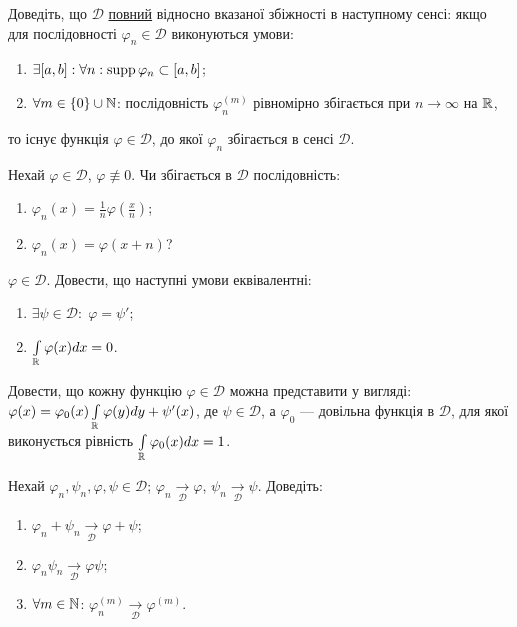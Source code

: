 \begin{exercise}
    Доведіть, що $\mathcal{D}$ \ul{повний} відносно вказаної збіжності в наступному сенсі:
    якщо для послідовності $\varphi_n \in \mathcal{D}$ виконуються умови:
    \begin{enumerate}
        \item $\exists [a,b]: \forall n: \operatorname{supp}\varphi_n \subset [a,b]$;
        \item $\forall m \in \{0\} \cup \mathbb{N}$: послідовність $\varphi_n^{(m)}$ рівномірно
        збігається при $n\to\infty$ на $\mathbb{R}$,
    \end{enumerate}
    то існує функція $\varphi \in \mathcal{D}$, до якої $\varphi_n$ збігається
    в сенсі $\mathcal{D}$.
\end{exercise}

\begin{exercise}
    Нехай $\varphi \in \mathcal{D}$, $\varphi \not\equiv 0$. Чи збігається в $\mathcal{D}$ послідовність:
    \begin{enumerate}
        \item $\varphi_n(x) = \frac{1}{n}\varphi\left(\frac{x}{n}\right)$;
        \item $\varphi_n(x) = \varphi(x+n)$?
    \end{enumerate}
\end{exercise}

\begin{exercise}
    $\varphi \in \mathcal{D}$. Довести, що наступні умови еквівалентні:
    \begin{enumerate}
        \item $\exists \psi \in \mathcal{D}:\; \varphi = \psi'$;
        \item $\int\limits_{\mathbb{R}} \varphi(x) dx = 0$.
    \end{enumerate}
\end{exercise}

\begin{exercise}
    Довести, що кожну функцію $\varphi \in \mathcal{D}$ можна представити у вигляді:
    $\varphi(x) = \varphi_0(x) \int\limits_{\mathbb{R}} \varphi(y) dy  + \psi'(x)$, де
    $\psi \in \mathcal{D}$, а $\varphi_0$ --- довільна функція в $\mathcal{D}$, для
    якої виконується рівність $\int\limits_{\mathbb{R}} \varphi_0(x) dx = 1$.
\end{exercise}

\begin{exercise}
    Нехай $\varphi_n, \psi_n, \varphi, \psi \in \mathcal{D}$;
    $\varphi_n \underset{\mathcal{D}}{\to} \varphi$, $\psi_n \underset{\mathcal{D}}{\to} \psi$.
    Доведіть:
    \begin{enumerate}
        \item $\varphi_n +\psi_n \underset{\mathcal{D}}{\to} \varphi +\psi$;
        \item $\varphi_n \psi_n \underset{\mathcal{D}}{\to} \varphi \psi$;
        \item $\forall m \in \mathbb{N}$: $\varphi_n^{(m)} \underset{\mathcal{D}}{\to} \varphi^{(m)}$.
    \end{enumerate}
\end{exercise}

